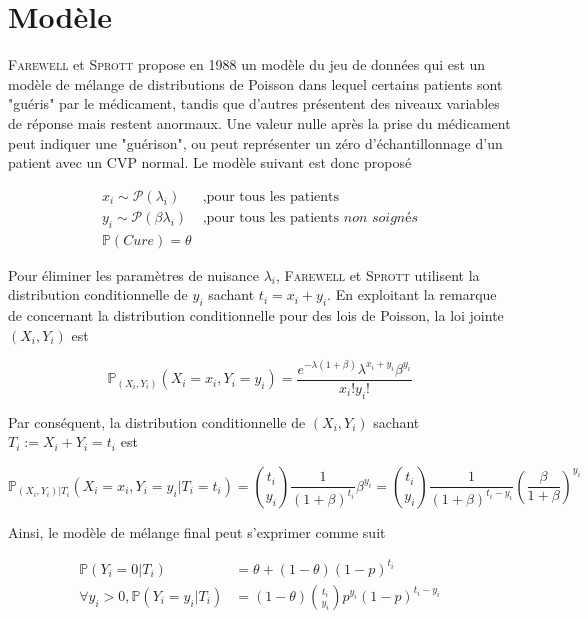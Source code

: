 \section{Modèle}

\textsc{Farewell} et \textsc{Sprott} propose en 1988 un modèle du jeu de données \cite{Farewell1988} qui est un modèle de mélange de distributions de Poisson dans lequel certains patients sont "guéris" par le médicament, tandis que d'autres présentent des niveaux variables de réponse mais restent anormaux.
Une valeur nulle après la prise du médicament peut indiquer une "guérison", ou peut représenter un zéro d'échantillonnage d'un patient avec un CVP normal.
Le modèle suivant est donc proposé

\begin{align*}
    x_i \sim \mathcal P(\lambda_i) ~ &,\text{pour tous les patients} \\
    y_i \sim \mathcal P(\beta \lambda_i) ~ &,\text{pour tous les patients }\textit{non soignés} \\
    \mathbb P(Cure) = \theta
\end{align*}

Pour éliminer les paramètres de nuisance $\lambda_i$, \textsc{Farewell} et \textsc{Sprott} utilisent la distribution conditionnelle de $y_i$ sachant $t_i = x_i + y_i$.
En exploitant la remarque de \cite{Cox1979} concernant la distribution conditionnelle pour des lois de Poisson, la loi jointe $(X_i, Y_i)$ est

\begin{equation*}
    \mathbb P_{(X_i, Y_i)}(X_i = x_i, Y_i = y_i) = \frac{e^{-\lambda(1 + \beta)} \lambda^{x_i + y_i} \beta^{y_i}}{x_i! y_i!}
\end{equation*}

Par conséquent, la distribution conditionnelle de $(X_i, Y_i)$ sachant $T_i := X_i + Y_i = t_i$ est

\begin{equation*}
    \mathbb P_{(X_i, Y_i) | T_i}(X_i = x_i, Y_i = y_i | T_i = t_i) = \binom{t_i}{y_i} \frac{1}{(1 + \beta)^{t_i}} \beta^{y_i} = \binom{t_i}{y_i} \frac{1}{(1 + \beta)^{t_i - y_i}} \left(\frac{\beta}{1 + \beta}\right)^{y_i}
\end{equation*}

Ainsi, le modèle de mélange final peut s'exprimer comme suit

\begin{align*}
    \mathbb P(Y_i = 0 | T_i) &= \theta + (1 - \theta)(1 - p)^{t_i} \\
    \forall y_i > 0, \mathbb P(Y_i = y_i | T_i) &= (1-\theta)\binom{t_i}{y_i} p^{y_i} (1-p)^{t_i-y_i}
\end{align*}